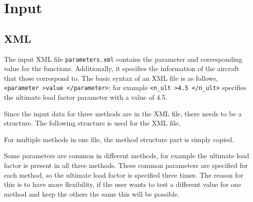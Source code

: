 
\section{Input}
\label{sec:input}
\subsection{XML}
\label{subsection:xml}
The input XML file \texttt{parameters.xml} contains the parameter and corresponding value for the functions.
Additionally, it specifies the information of the aircraft that those correspond to.
The basic syntax of an XML file is as follows, \texttt{\textless parameter \textgreater value \textless /parameter\textgreater}; for example \texttt{\textless n\_ult \textgreater 4.5 \textless/n\_ult\textgreater} specifies the ultimate load factor parameter with a value of 4.5.

Since the input data for three methods are in the XML file, there needs to be a structure.
The following structure is used for the XML file,

For multiple methods in one file, the method structure part is simply copied.

Some parameters are common in different methods, for example the ultimate load factor is present in all three methods.
These common parameters are specified for each method, so the ultimate load factor is specified three times.
The reason for this is to have more flexibility, if the user wants to test a different value for one method and keep the others the same this will be possible.
